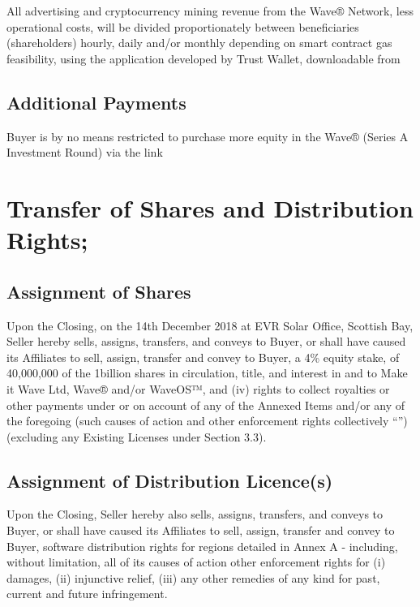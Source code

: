 \documentclass[letterpaper,10pt,english]{sphinxmanual}
\begin{document}
All advertising and cryptocurrency mining revenue from the Wave® Network, less operational costs, will be divided proportionately between beneficiaries (shareholders) hourly, daily and/or monthly depending on smart contract gas feasibility, using the application developed by Trust Wallet, downloadable from 


\subsection{Additional Payments}
\label{\detokenize{2-delivery:additional-payments}}
Buyer is by no means restricted to purchase more equity in the Wave® (Series A Investment Round) via the link 


\section{Transfer of Shares and Distribution Rights;}
\label{\detokenize{3-transfer:transfer-of-shares-and-distribution-rights}}\label{\detokenize{3-transfer::doc}}

\subsection{Assignment of Shares}
\label{\detokenize{3-transfer:assignment-of-shares}}
Upon the Closing, on the 14th December 2018 at EVR Solar Office, Scottish Bay, Seller hereby sells, assigns, transfers, and conveys to Buyer, or shall have caused its Affiliates to sell, assign, transfer and convey to Buyer, a 4\% equity stake, of 40,000,000 of the 1billion shares in circulation, title, and interest in and to Make it Wave Ltd, Wave® and/or WaveOS™, and (iv) rights to collect royalties or other payments under or on account of any of the Annexed Items and/or any of the foregoing (such causes of action and other enforcement rights collectively “”) (excluding any Existing Licenses under Section 3.3).


\subsection{Assignment of Distribution Licence(s)}
\label{\detokenize{3-transfer:assignment-of-distribution-licence-s}}
Upon the Closing, Seller hereby also sells, assigns, transfers, and conveys to Buyer, or shall have caused its Affiliates to sell, assign, transfer and convey to Buyer, software distribution rights for regions detailed in Annex A - including, without limitation, all of its causes of action other enforcement rights for (i) damages, (ii) injunctive relief, (iii) any other remedies of any kind for past, current and future infringement.
\end{document}
